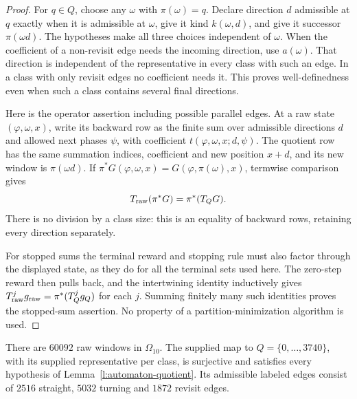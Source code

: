 \begin{proof}
For \(q\in Q\), choose any \(\omega\) with \(\pi(\omega)=q\).
Declare direction \(d\) admissible at \(q\) exactly when it is
admissible at \(\omega\), give it kind \(k(\omega,d)\), and give
it successor \(\pi(\omega d)\). The hypotheses make all three
choices independent of \(\omega\). When the coefficient of a
non-revisit edge needs the incoming direction, use \(a(\omega)\).
That direction is independent of the representative in every class
with such an edge. In a class with only revisit edges no coefficient
needs it. This proves well-definedness even when such a class
contains several final directions.

Here is the operator assertion including possible parallel edges.
At a raw state \((\varphi,\omega,x)\), write its backward row as
the finite sum over admissible directions \(d\) and allowed next
phases \(\psi\), with coefficient
\(t(\varphi,\omega,x;d,\psi)\). The quotient row has the same
summation indices, coefficient and new position \(x+d\), and its
new window is \(\pi(\omega d)\). If
\(\pi^*G(\varphi,\omega,x)=G(\varphi,\pi(\omega),x)\), termwise
comparison gives
\[
 T_{\rm raw}(\pi^*G)=\pi^*(T_QG).
\]
There is no division by a class size: this is an equality of
backward rows, retaining every direction separately.

For stopped sums the terminal reward and stopping rule must also
factor through the displayed state, as they do for all the terminal
sets used here. The zero-step reward then pulls back, and the
intertwining identity inductively gives
\(T_{\rm raw}^jg_{\rm raw}=\pi^*(T_Q^jg_Q)\) for each \(j\).
Summing finitely many such identities proves the stopped-sum
assertion. No property of a partition-minimization algorithm is used.
\end{proof}

\begin{proposition}\label{p:automaton10}
There are \(60092\) raw windows in \(\Omega_{10}\).
The supplied map to \(Q=\{0,\ldots,3740\}\), with its supplied
representative per class, is surjective and satisfies every
hypothesis of Lemma~\ref{l:automaton-quotient}.
Its admissible labeled edges consist of \(2516\) straight,
\(5032\) turning and \(1872\) revisit edges.
\end{proposition}

